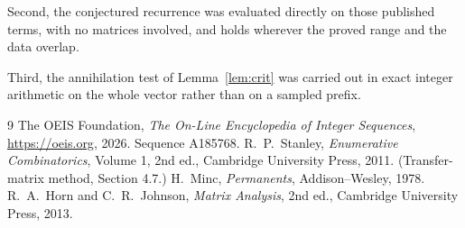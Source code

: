 \documentclass[11pt,a4paper]{article}
\theoremstyle{plain}
\theoremstyle{definition}
\begin{document}
Second, the conjectured recurrence was evaluated directly on those published terms, with no
matrices involved, and holds wherever the proved range and the data overlap.

Third, the annihilation test of Lemma~\ref{lem:crit} was carried out in exact integer
arithmetic on the whole vector rather than on a sampled prefix.

\begin{thebibliography}{9}
 The OEIS Foundation, \emph{The On-Line Encyclopedia of Integer
Sequences}, \url{https://oeis.org}, 2026. Sequence A185768.
 R.~P.~Stanley, \emph{Enumerative Combinatorics}, Volume 1, 2nd ed.,
Cambridge University Press, 2011. (Transfer-matrix method, Section 4.7.)
 H.~Minc, \emph{Permanents}, Addison--Wesley, 1978.
 R.~A.~Horn and C.~R.~Johnson, \emph{Matrix Analysis}, 2nd ed., Cambridge
University Press, 2013.
\end{thebibliography}
\end{document}

